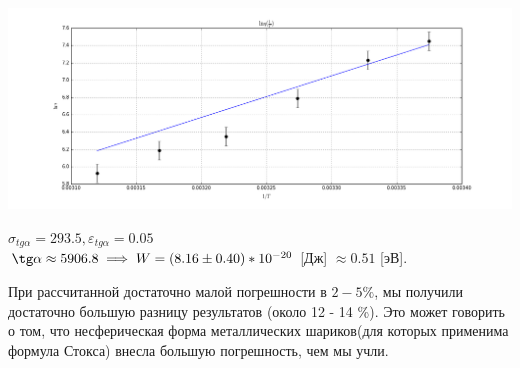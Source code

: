 \documentclass[10pt]{article}
\begin{document}
\begin{enumerate}
\begin{table}[htp]
\begin{tabular}{|c|c|c|c|c|c|c|c|c|c|c|c|c|c|}
                                \hline
                        \end{tabular}
    \end{table}
    \begin{center}
    \includegraphics[width=18cm]{g2.png} 
    \end{center}

    $\sigma_{tg \alpha} = 293.5 , \varepsilon_{tg \alpha} = 0.05$ \\
    $\tg \alpha \approx 5906.8 \implies W = (8.16 \pm 0.40)* 10^{-20}$ [Дж] $\approx 0.51$ [эВ].

    При рассчитанной достаточно малой погрешности в $2 - 5 \%$, мы получили достаточно большую разницу результатов (около 12 - 14 \%). Это может говорить о том, что несферическая форма металлических шариков(для которых применима формула Стокса) внесла большую погрешность, чем мы учли. 

\end{enumerate}
\end{document}
